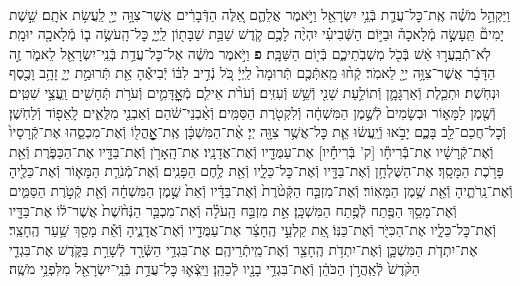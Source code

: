 \documentclass[twoside, openany, parskip=half, 11pt]{book}
\begin{document}
\begin{sometimes}
\begin{footnotesize}
\begin{multicols}{2}
\\
וַיַּקְהֵ֣ל מֹשֶׁ֗ה אֶֽת־כׇּל־עֲדַ֛ת בְּֿנֵ֥י יִשְׂרָאֵ֖ל וַיֹּ֣אמֶר אֲלֵהֶ֑ם אֵ֚לֶּה הַדְּֿבָרִ֔ים אֲשֶׁר־צִוָּ֥ה יְיָ֖ לַֽעֲשׂ֥ת אֹתָֽם׃ שֵׁ֣שֶׁת יָמִים֘ תֵּֽעָשֶׂ֣ה מְֿלָאכָה֒ וּבַיּ֣וֹם הַשְּֿׁבִיעִ֗י יִהְיֶ֨ה לָכֶ֥ם קֹ֛דֶשׁ שַׁבַּ֥ת שַׁבָּת֖וֹן לַֽיְיָ֑ כׇּל־הָֽעֹשֶׂ֥ה ב֛וֹ מְֿלָאכָ֖ה יוּמָֽת׃ לֹֽא־תְֿֿבַֽעֲר֣וּ אֵ֔שׁ בְּֿכֹ֖ל מֽשְׁבֹֽתֵיכֶ֑ם בְּֿי֖וֹם הַשַּׁבָּֽת׃ \textbf{פ}
וַיֹּ֣אמֶר מֹשֶׁ֔ה אֶל־כׇּל־עֲדַ֥ת בְּֿנֵֽי־יִשְׂרָאֵ֖ל לֵאמֹ֑ר זֶ֣ה הַדָּבָ֔ר אֲשֶׁר־צִוָּ֥ה יְיָ֖ לֵאמֹֽר׃ קְֿח֨וּ מֵֽאִתְּֿכֶ֤ם תְּֿרוּמָה֙ לַֽיְיָ֔ כֹּ֚ל נְֿדִ֣יב לִבּ֔וֹ יְֿבִיאֶ֕הָ אֵ֖ת תְּֿרוּמַ֣ת יְיָ֑ זָהָ֥ב וָכֶ֖סֶף וּנְחֹֽשֶׁת׃ וּתְכֵ֧לֶת וְֿאַרְגָּמָ֛ן וְֿתוֹלַ֥עַת שָׁנִ֖י וְֿשֵׁ֥שׁ וְֿעִזִּֽים׃ וְֿעֹרֹ֨ת אֵילִ֧ם מְֿאׇׇׇׇׇׇׇׇׇׇׇׇָדָּמִ֛ים וְֿעֹרֹ֥ת תְּֿחָשִׁ֖ים וַֽעֲצֵ֥י שִׁטִּֽים׃ וְֿשֶׁ֖מֶן לַמָּא֑וֹר וּבְשָׂמִים֙ לְֿשֶׁ֣מֶן הַמִּשְׁחָ֔ה וְֿלִקְטֹ֖רֶת הַסַּמִּֽים׃ וְֿאַ֨בְנֵי־שֹׁ֔הַם וְֿאַבְנֵ֖י מִלֻּאִ֑ים לָֽאֵפ֖וֹד וְֿלַחֹֽשֶׁן׃ וְֿכׇל־חֲכַם־לֵ֖ב בָּכֶ֑ם יָבֹ֣אוּ וְֿיַֽעֲשׂ֔וּ אֵ֛ת כׇּל־אֲשֶׁ֥ר צִוָּ֖ה יְיָ׃
אֶ֨ת־הַמִּשְׁכָּ֔ן אֶֽת־אׇׇׇׇׇׇׇׇׇׇָֽהֳל֖וֹ וְֿאֶת־מִכְסֵ֑הוּ אֶת־קְֿרָסָיו֙ וְֿאֶת־קְֿרָשָׁ֔יו אֶת־בְּֿֿרִיחָ֕ו [ק' בְּֿרִיחָ֕יו] אֶת־עַמֻּדָ֖יו וְֿאֶת־אֲדָנָֽיו׃ אֶת־הָֽאָרֹ֥ן וְֿאֶת־בַּדָּ֖יו אֶת־הַכַּפֹּ֑רֶת וְֿאֵ֖ת פָּרֹ֥כֶת הַמָּסָֽךְ׃ אֶת־הַשֻּׁלְחָ֥ן וְֿאֶת־בַּדָּ֖יו וְֿאֶת־כׇּל־כֵּלָ֑יו וְֿאֵ֖ת לֶ֥חֶם הַפָּנִֽים׃ וְֿאֶת־מְֿנֹרַ֧ת הַמָּא֛וֹר וְֿאֶת־כֵּלֶ֖יהָ וְֿאֶת־נֵֽרֹתֶ֑יהָ וְֿאֵ֖ת שֶׁ֥מֶן הַמָּאֽוֹר׃ וְֿאֶת־מִזְבַּ֤ח הַקְּֿטֹ֨רֶת֙ וְֿאֶת־בַּדָּ֔יו וְֿאֵת֙ שֶׁ֣מֶן הַמִּשְׁחָ֔ה וְֿאֵ֖ת קְֿטֹ֣רֶת הַסַּמִּ֑ים וְֿאֶת־מָסַ֥ךְ הַפֶּ֖תַח לְֿפֶ֥תַח הַמִּשְׁכָּֽן׃ אֵ֣ת מִזְבַּ֣ח הָֽעֹלָ֗ה וְֿאֶת־מִכְבַּ֤ר הַנְּֿחֹ֨שֶׁת֙ אֲשֶׁר־ל֔וֹ אֶת־בַּדָּ֖יו וְֿאֶת־כׇּל־כֵּלָ֑יו אֶת־הַכִּיֹּ֖ר וְֿאֶת־כַּנּֽוֹ׃ אֵ֚ת קַלְעֵ֣י הֶֽחָצֵ֔ר אֶת־עַמֻּדָ֖יו וְֿאֶת־אֲדָנֶ֑יהָ וְֿאֵ֕ת מָסַ֖ךְ שַׁ֥עַר הֶֽחָצֵֽר׃ אֶת־יִתְדֹ֧ת הַמִּשְׁכָּ֛ן וְֿאֶת־יִתְדֹ֥ת הֶֽחָצֵ֖ר וְֿאֶת־מֵֽיתְֿרֵיהֶֽם׃ אֶת־בִּגְדֵ֥י הַשְּֿׂרָ֖ד לְֿשָׁרֵ֣ת בַּקֹּ֑דֶשׁ אֶת־בִּגְדֵ֤י הַקֹּ֨דֶשׁ֙ לְֿאַֽהֲרֹ֣ן הַכֹּהֵ֔ן וְֿאֶת־בִּגְדֵ֥י בָנָ֖יו לְֿכַהֵֽן׃ וַיֵּֽצְֿא֛וּ כׇּל־עֲדַ֥ת בְּֿנֵֽי־יִשְׂרָאֵ֖ל מִלִּפְנֵ֥י מֹשֶֽׁה׃


\end{multicols}
\end{footnotesize}
\end{sometimes}
\end{document}
